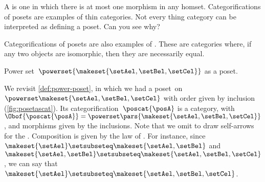 
\begin{remark}
    A  is one in which there is at most one morphism in any homset. Categorifications of posets are examples of thin categories.  Not every thing category can be interpreted as defining a poset. Can you see why?
\end{remark}

\begin{remark}
    Categorifications of posets are also examples of . These are categories where, if any two objects are isomorphic, then they are necessarily equal.
\end{remark}


\begin{marginfigure}
    \centering
    \caption{Power set~$\powerset{\makeset{\setAel,\setBel,\setCel}}$ as a poset.
        \label{fig:posetascat}}
\end{marginfigure}

\begin{example}
    We revisit \cref{def:power-poset}, in which we had a poset~\posA on $\powerset \makeset{\setAel,\setBel,\setCel}$ with order given by inclusion (\cref{fig:posetascat}).
    Its categorification~$\poscat{\posA}$ is a category, with $\Obof{\poscat{\posA}}=\powerset\pars{\makeset{\setAel,\setBel,\setCel}}$, and morphisms given by the inclusions.
    Note that we omit to draw self-arrows for the .
    Composition is given by the  law of .
    For instance, since~$\makeset{\setAel}\setsubseteq \makeset{\setAel,\setBel}$ and~$\makeset{\setAel,\setBel} \setsubseteq \makeset{\setAel,\setBel,\setCel}$, we can say that~$\makeset{\setAel}\setsubseteq \makeset{\setAel,\setBel,\setCel}$.
\end{example}